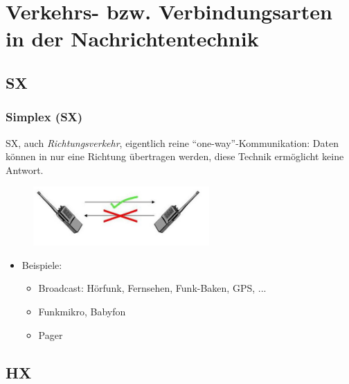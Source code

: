 \section[Verkehrsarten]{Verkehrs- bzw. Verbindungsarten in der Nachrichtentechnik}

\subsection{SX}

\begin{frame}
  \frametitle{Simplex (SX)}

  SX, auch \emph{Richtungsverkehr}, eigentlich reine
  ``one-way''-Kommunikation: Daten können in nur eine Richtung übertragen
  werden, diese Technik ermöglicht keine Antwort.

  \begin{center}
    \begin{figure}
      \includegraphics[width=0.6\textwidth]{bv11/Simplex.jpg}
    \end{figure}
  \end{center}

  \begin{itemize}
    \item Beispiele:
      \begin{itemize}
        \item Broadcast: Hörfunk, Fernsehen, Funk-Baken, GPS, ...
        \item Funkmikro, Babyfon
        \item Pager
      \end{itemize}
  \end{itemize}

\end{frame}

\subsection{HX}

